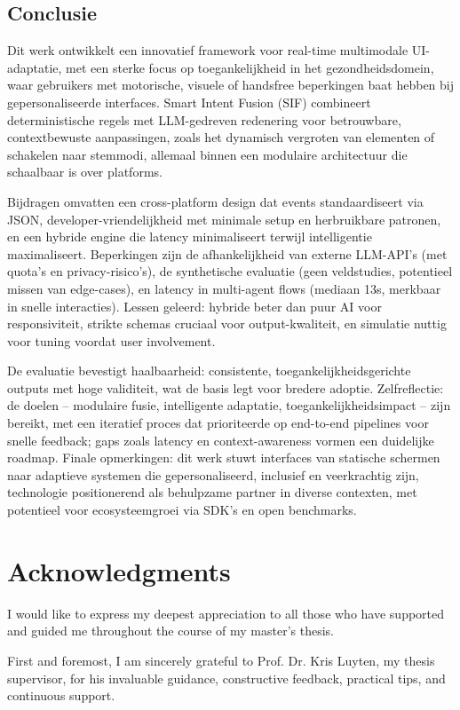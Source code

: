\documentclass[openany]{book}
\begin{document}
\section*{Conclusie}
Dit werk ontwikkelt een innovatief framework voor real-time multimodale UI-adaptatie, met een sterke focus op toegankelijkheid in het gezondheidsdomein, waar gebruikers met motorische, visuele of handsfree beperkingen baat hebben bij gepersonaliseerde interfaces. Smart Intent Fusion (SIF) combineert deterministische regels met LLM-gedreven redenering voor betrouwbare, contextbewuste aanpassingen, zoals het dynamisch vergroten van elementen of schakelen naar stemmodi, allemaal binnen een modulaire architectuur die schaalbaar is over platforms.

Bijdragen omvatten een cross-platform design dat events standaardiseert via JSON, developer-vriendelijkheid met minimale setup en herbruikbare patronen, en een hybride engine die latency minimaliseert terwijl intelligentie maximaliseert. Beperkingen zijn de afhankelijkheid van externe LLM-API's (met quota's en privacy-risico's), de synthetische evaluatie (geen veldstudies, potentieel missen van edge-cases), en latency in multi-agent flows (mediaan 13s, merkbaar in snelle interacties). Lessen geleerd: hybride beter dan puur AI voor responsiviteit, strikte schemas cruciaal voor output-kwaliteit, en simulatie nuttig voor tuning voordat user involvement.

De evaluatie bevestigt haalbaarheid: consistente, toegankelijkheidsgerichte outputs met hoge validiteit, wat de basis legt voor bredere adoptie. Zelfreflectie: de doelen – modulaire fusie, intelligente adaptatie, toegankelijkheidsimpact – zijn bereikt, met een iteratief proces dat prioriteerde op end-to-end pipelines voor snelle feedback; gaps zoals latency en context-awareness vormen een duidelijke roadmap. Finale opmerkingen: dit werk stuwt interfaces van statische schermen naar adaptieve systemen die gepersonaliseerd, inclusief en veerkrachtig zijn, technologie positionerend als behulpzame partner in diverse contexten, met potentieel voor ecosysteemgroei via SDK's en open benchmarks.

\chapter*{Acknowledgments}
I would like to express my deepest appreciation to all those who have supported and guided me throughout the course of my master’s thesis.

First and foremost, I am sincerely grateful to Prof. Dr. Kris Luyten, my thesis supervisor, for his invaluable guidance, constructive feedback, practical tips, and continuous support.
\end{document}
